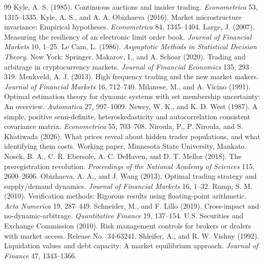 \begin{thebibliography}{99}
 Kyle, A. S. (1985). Continuous auctions and insider trading. \emph{Econometrica} 53, 1315--1335.
 Kyle, A. S., and A. A. Obizhaeva (2016). Market microstructure invariance: Empirical hypotheses. \emph{Econometrica} 84, 1345--1404.
 Large, J. (2007). Measuring the resiliency of an electronic limit order book. \emph{Journal of Financial Markets} 10, 1--25.
 Le Cam, L. (1986). \emph{Asymptotic Methods in Statistical Decision Theory}. New York: Springer.
 Makarov, I., and A. Schoar (2020). Trading and arbitrage in cryptocurrency markets. \emph{Journal of Financial Economics} 135, 293--319.
 Menkveld, A. J. (2013). High frequency trading and the new market makers. \emph{Journal of Financial Markets} 16, 712--740.
 Milanese, M., and A. Vicino (1991). Optimal estimation theory for dynamic systems with set membership uncertainty: An overview. \emph{Automatica} 27, 997--1009.
 Newey, W. K., and K. D. West (1987). A simple, positive semi-definite, heteroskedasticity and autocorrelation consistent covariance matrix. \emph{Econometrica} 55, 703--708.
 Niroula, P., P. Niroula, and S. Khatiwada (2026). What prices reveal about hidden trader populations, and what identifying them costs. Working paper, Minnesota State University, Mankato.
 Nosek, B. A., C. R. Ebersole, A. C. DeHaven, and D. T. Mellor (2018). The preregistration revolution. \emph{Proceedings of the National Academy of Sciences} 115, 2600--2606.
 Obizhaeva, A. A., and J. Wang (2013). Optimal trading strategy and supply/demand dynamics. \emph{Journal of Financial Markets} 16, 1--32.
 Rump, S. M. (2010). Verification methods: Rigorous results using floating-point arithmetic. \emph{Acta Numerica} 19, 287--449.
 Schneider, M., and F. Lillo (2019). Cross-impact and no-dynamic-arbitrage. \emph{Quantitative Finance} 19, 137--154.
 U.S. Securities and Exchange Commission (2010). Risk management controls for brokers or dealers with market access. Release No.\ 34-63241.
 Shleifer, A., and R. W. Vishny (1992). Liquidation values and debt capacity: A market equilibrium approach. \emph{Journal of Finance} 47, 1343--1366.

\end{thebibliography}
